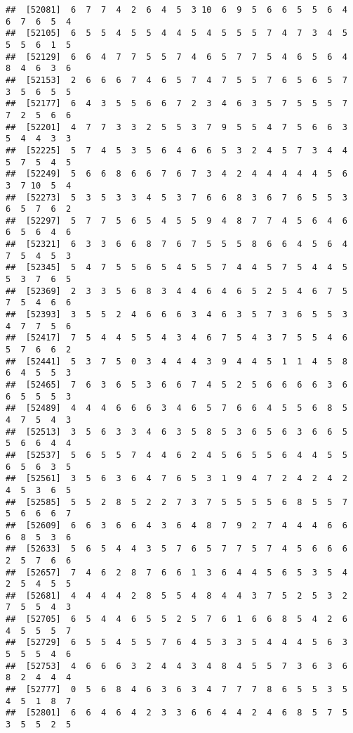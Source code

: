\documentclass[
]{book}
\begin{document}
\begin{verbatim}
##  [52081]  6  7  7  4  2  6  4  5  3 10  6  9  5  6  6  5  5  6  4  6  7  6  5  4
##  [52105]  6  5  5  4  5  5  4  4  5  4  5  5  5  7  4  7  3  4  5  5  5  6  1  5
##  [52129]  6  6  4  7  7  5  5  7  4  6  5  7  7  5  4  6  5  6  4  8  4  6  3  6
##  [52153]  2  6  6  6  7  4  6  5  7  4  7  5  5  7  6  5  6  5  7  3  5  6  5  5
##  [52177]  6  4  3  5  5  6  6  7  2  3  4  6  3  5  7  5  5  5  7  7  2  5  6  6
##  [52201]  4  7  7  3  3  2  5  5  3  7  9  5  5  4  7  5  6  6  3  5  4  4  3  3
##  [52225]  5  7  4  5  3  5  6  4  6  6  5  3  2  4  5  7  3  4  4  5  7  5  4  5
##  [52249]  5  6  6  8  6  6  7  6  7  3  4  2  4  4  4  4  4  5  6  3  7 10  5  4
##  [52273]  5  3  5  3  3  4  5  3  7  6  6  8  3  6  7  6  5  5  3  6  5  7  6  2
##  [52297]  5  7  7  5  6  5  4  5  5  9  4  8  7  7  4  5  6  4  6  6  5  6  4  6
##  [52321]  6  3  3  6  6  8  7  6  7  5  5  5  8  6  6  4  5  6  4  7  5  4  5  3
##  [52345]  5  4  7  5  5  6  5  4  5  5  7  4  4  5  7  5  4  4  5  5  3  7  6  5
##  [52369]  2  3  3  5  6  8  3  4  4  6  4  6  5  2  5  4  6  7  5  7  5  4  6  6
##  [52393]  3  5  5  2  4  6  6  6  3  4  6  3  5  7  3  6  5  5  3  4  7  7  5  6
##  [52417]  7  5  4  4  5  5  4  3  4  6  7  5  4  3  7  5  5  4  6  5  7  6  6  2
##  [52441]  5  3  7  5  0  3  4  4  4  3  9  4  4  5  1  1  4  5  8  6  4  5  5  3
##  [52465]  7  6  3  6  5  3  6  6  7  4  5  2  5  6  6  6  6  3  6  6  5  5  5  3
##  [52489]  4  4  4  6  6  6  3  4  6  5  7  6  6  4  5  5  6  8  5  4  7  5  4  3
##  [52513]  3  5  6  3  3  4  6  3  5  8  5  3  6  5  6  3  6  6  5  5  6  6  4  4
##  [52537]  5  6  5  5  7  4  4  6  2  4  5  6  5  5  6  4  4  5  5  6  5  6  3  5
##  [52561]  3  5  6  3  6  4  7  6  5  3  1  9  4  7  2  4  2  4  2  4  5  3  6  5
##  [52585]  5  5  2  8  5  2  2  7  3  7  5  5  5  5  6  8  5  5  7  5  6  6  6  7
##  [52609]  6  6  3  6  6  4  3  6  4  8  7  9  2  7  4  4  4  6  6  6  8  5  3  6
##  [52633]  5  6  5  4  4  3  5  7  6  5  7  7  5  7  4  5  6  6  6  2  5  7  6  6
##  [52657]  7  4  6  2  8  7  6  6  1  3  6  4  4  5  6  5  3  5  4  2  5  4  5  5
##  [52681]  4  4  4  4  2  8  5  5  4  8  4  4  3  7  5  2  5  3  2  7  5  5  4  3
##  [52705]  6  5  4  4  6  5  5  2  5  7  6  1  6  6  8  5  4  2  6  4  5  5  5  7
##  [52729]  6  5  5  4  5  5  7  6  4  5  3  3  5  4  4  4  5  6  3  5  5  5  4  6
##  [52753]  4  6  6  6  3  2  4  4  3  4  8  4  5  5  7  3  6  3  6  8  2  4  4  4
##  [52777]  0  5  6  8  4  6  3  6  3  4  7  7  7  8  6  5  5  3  5  4  5  1  8  7
##  [52801]  6  6  4  6  4  2  3  3  6  6  4  4  2  4  6  8  5  7  5  3  5  5  2  5

\end{verbatim}
\end{document}
